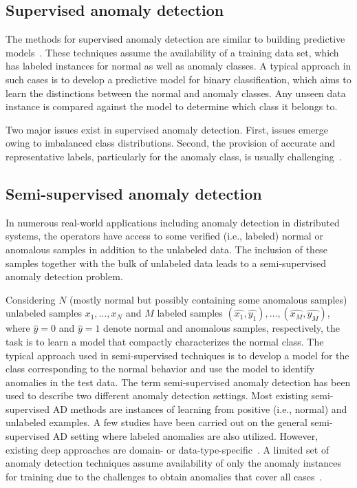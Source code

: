 \subsection{Supervised anomaly detection} 
\label{ch:background:sec:anomalydetection:subsec:supervised}
The methods for supervised anomaly detection are similar to building predictive models~\cite{chandola2009anomaly}. These techniques assume the availability of a training data set, which has labeled instances for normal as well as anomaly classes. A typical approach in such cases is to develop a predictive model for binary classification, which aims to learn the distinctions between the normal and anomaly classes.
Any unseen data instance is compared against the model to determine which class it belongs to. 

Two major issues exist in supervised anomaly detection. First, issues emerge owing to imbalanced class distributions. Second, the provision of accurate and representative labels, particularly for the anomaly class, is usually challenging~\cite{theiler2003resampling, steinwart2005classification}. 

\subsection{Semi-supervised anomaly detection}
\label{ch:background:sec:anomalydetection:subsec:semisupervised}
In numerous real-world applications including anomaly detection in distributed systems, the operators have access to some verified (i.e., labeled) normal or anomalous samples in addition to the unlabeled data. The inclusion of these samples together with the bulk of unlabeled data leads to a semi-supervised anomaly detection problem. 

Considering $N$ (mostly normal but possibly containing some anomalous samples) unlabeled samples $x_1,\dots, x_N$ and $M$ labeled samples $(\hat{x_1}, \hat{y_1}),\dots,(\hat{x_M}, \hat{y_M})$, where $\hat{y} = 0$ and $\hat{y} = 1$ denote normal and anomalous samples, respectively, the task is to learn a model that compactly characterizes the normal class. The typical approach used in semi-supervised techniques is to develop a model for the class corresponding to the normal behavior and use the model to identify anomalies in the test data. The term semi-supervised anomaly detection has been used to describe two different anomaly detection settings. Most existing semi-supervised AD methods are instances of learning from positive (i.e., normal) and unlabeled examples. A few studies have been carried out on the general semi-supervised AD setting where labeled anomalies are also utilized. However, existing deep approaches are domain- or data-type-specific~\cite{ruff2019deep,chandola2009anomaly}. A limited set of anomaly detection techniques assume availability of only the anomaly instances for training due to the challenges to obtain anomalies that cover all cases~\cite{ruff2019deep}.

